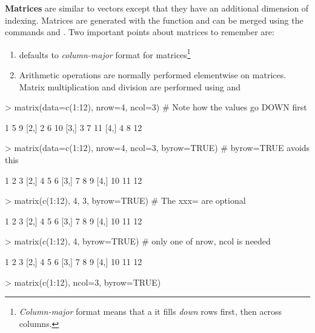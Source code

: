 \documentclass[10pt,letterpaper]{article}
\begin{document}
\textbf{Matrices} are similar to vectors except that they have an additional dimension of indexing.  Matrices are generated with the  function and can be merged using the commands  and .  Two important points about matrices to remember are:
\begin{enumerate}
  \item \R defaults to \emph{column-major} format for matrices\footnote{\emph{Column-major} format means that a it fills \emph{down} rows first, then across columns.}
  \item Arithmetic operations are normally performed elementwise on matrices.  Matrix multiplication and division are performed using \Com{\%*\%} and \Com{\%/\%}
\end{enumerate}

\begin{Schunk}
\begin{Sinput}
> matrix(data=c(1:12), nrow=4, ncol=3)    # Note how the values go DOWN first
\end{Sinput}
\begin{Soutput}
     [,1] [,2] [,3]
[1,]    1    5    9
[2,]    2    6   10
[3,]    3    7   11
[4,]    4    8   12
\end{Soutput}
\begin{Sinput}
> matrix(data=c(1:12), nrow=4, ncol=3, byrow=TRUE)   # byrow=TRUE avoids this
\end{Sinput}
\begin{Soutput}
     [,1] [,2] [,3]
[1,]    1    2    3
[2,]    4    5    6
[3,]    7    8    9
[4,]   10   11   12
\end{Soutput}
\begin{Sinput}
> matrix(c(1:12), 4, 3, byrow=TRUE)       # The xxx= are optional
\end{Sinput}
\begin{Soutput}
     [,1] [,2] [,3]
[1,]    1    2    3
[2,]    4    5    6
[3,]    7    8    9
[4,]   10   11   12
\end{Soutput}
\begin{Sinput}
> matrix(c(1:12), 4, byrow=TRUE)          # only one of nrow, ncol is needed
\end{Sinput}
\begin{Soutput}
     [,1] [,2] [,3]
[1,]    1    2    3
[2,]    4    5    6
[3,]    7    8    9
[4,]   10   11   12
\end{Soutput}
\begin{Sinput}
> matrix(c(1:12), ncol=3, byrow=TRUE)
\end{Sinput}

\end{Schunk}
\end{document}
